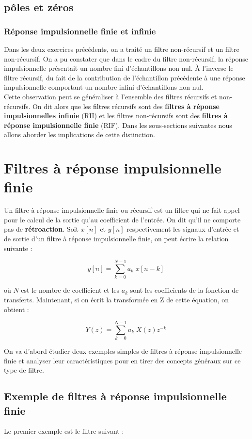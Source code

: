 \documentclass[11pt,a4paper]{article}
\begin{document}
\subsection{pôles et zéros}

\subsubsection{Réponse impulsionnelle finie et infinie}
Dans les deux exercices précédents, on a traité un filtre non-récursif et un filtre non-récursif. On a pu constater que dans le cadre du filtre non-récursif, la réponse impulsionnelle présentait un nombre fini d'échantillons non nul. \`A l'inverse le filtre récursif, du fait de la contribution de l'échantillon précédente à une réponse impulsionnelle comportant un nombre infini d'échantillons non nul.\\

Cette observation peut se généraliser à l'ensemble des filtres récursifs et non-récursifs. On dit alors que les filtres récursifs sont des \textbf{filtres à réponse impulsionnelles infinie} (RII) et les filtres non-récursifs sont des \textbf{filtres à réponse impulsionnelle finie} (RIF). Dans les sous-sections suivantes nous allons aborder les implications de cette distinction.

\section{Filtres à réponse impulsionnelle finie}
Un filtre à réponse impulsionnelle finie ou récursif est un filtre qui ne fait appel pour le calcul de la sortie qu'au coefficient de l'entrée. On dit qu'il ne comporte pas de \textbf{rétroaction}. Soit $x[n]$ et $y[n]$  respectivement les signaux d'entrée et de sortie d'un filtre à réponse impulsionnelle finie, on peut écrire la relation suivante : 

\[ y[n] =  \sum_{k = 0}^{N-1} a_k \; x[n-k]\] 

où $N$ est le nombre de coefficient et les $a_k$ sont les coefficients de la fonction de transferts. Maintenant, si on écrit la transformée en Z de cette équation, on obtient :

\[ Y(z) =  \sum_{k = 0}^{N-1} a_k \; X(z)z^{-k} \] 

On va d'abord étudier deux exemples simples de filtres à réponse impulsionnelle finie et analyser leur caractéristiques pour en tirer des concepts généraux sur ce type de filtre.

\subsection{Exemple de filtres à réponse impulsionnelle finie}
Le premier exemple est le filtre suivant : 
\end{document}
